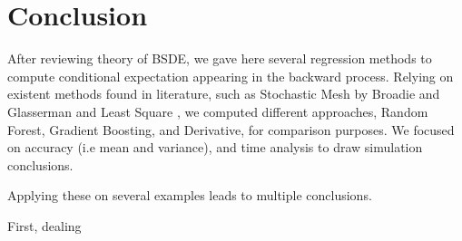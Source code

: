 \documentclass[english,11pt,openany]{article}
\theoremstyle{definition}
\theoremstyle{plain}
\theoremstyle{definition}
\begin{document}
	\newpage 
	
	
	\section{Conclusion}
	
	After reviewing theory of BSDE, we gave here several regression methods to compute conditional expectation appearing in the backward process. 
	Relying on existent methods found in literature, such as Stochastic Mesh by Broadie and Glasserman \cite{glasserman:broadie} and Least Square \cite{bender:lsmbsde}, we computed different approaches, Random Forest, Gradient Boosting, and Derivative, for comparison purposes.
	We focused on accuracy (i.e mean and variance), and time analysis to draw simulation conclusions. 
	
	
	Applying these on several examples leads to multiple conclusions. 
	
	First, dealing
	
\end{document}
